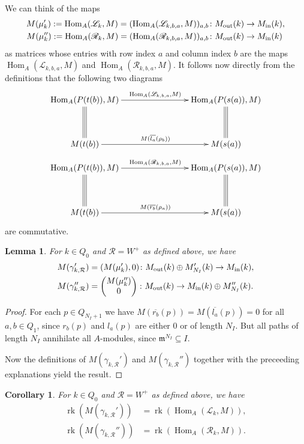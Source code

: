 \documentclass[12pt,reqno]{amsart}
\newtheorem{Lem}[Thm]{Lemma}
\newtheorem{Cor}[Thm]{Corollary}
\theoremstyle{definition}
\newcommand{\df}{\colon}
\newcommand{\scL}{{\mathscr L}}
\newcommand{\scR}{{\mathscr R}}
\newcommand{\cR}{{\mathcal R}}
\newcommand{\m}{\mathfrak{m}}
\newcommand{\rk}{\operatorname{rk}}
\newcommand{\Hom}{\operatorname{Hom}}
\newcommand{\ov}{\overline}
\begin{document}
We can think of the maps 
\begin{align*}
M(\mu_k') := \Hom_A(\scL_k,M) = (\Hom_A(\scL_{k,b,a},M))_{a,b}
\df M_{\rm out}(k) &\to M_{\rm in}(k),
\\
M(\mu_k'') := \Hom_A(\scR_k,M)= (\Hom_A(\scR_{k,b,a},M))_{a,b}\df 
M_{\rm out}(k) &\to M_{\rm in}(k)
\end{align*}
as matrices whose entries with row index $a$ and column index 
$b$ are the maps $\Hom_A(\scL_{k,b,a},M)$ and 
$\Hom_A(\scR_{k,b,a},M)$.
It follows now directly from the definitions that
the following two
diagrams
$$
\xymatrix@+3ex{
\Hom_A(P(t(b)),M) \ar@3{-}[d] \ar[rr]^{\Hom_A(\scL_{k,b,a},M)} 
&& \Hom_A(P(s(a)),M) \ar@3{-}[d]
\\
M(t(b)) \ar[rr]^{M(\ov{l_a}(\rho_b))} && M(s(a))
}
$$
$$
\xymatrix@+3ex{
\Hom_A(P(t(b)),M) \ar@3{-}[d] \ar[rr]^{\Hom_A(\scR_{k,b,a},M)} 
&& \Hom_A(P(s(a)),M) \ar@3{-}[d]
\\
M(t(b)) \ar[rr]^{M(\ov{r_b}(\rho_a))} && M(s(a))
}
$$
are commutative.

\begin{Lem}\label{lem:h2}
For $k \in Q_0$ and $\cR = W^+$ as defined above, we have
\begin{align*}
M(\gamma_{k,\cR}') &= (M(\mu_k'),0)\df 
M_{\rm out}(k) \oplus M_{N_I}'(k) \to M_{\rm in}(k),
\\
M(\gamma_{k,\cR}'') &= \left(\begin{matrix} M(\mu_k'')\\0\end{matrix}\right)\df 
M_{\rm out}(k)  \to M_{\rm in}(k) \oplus M_{N_I}''(k).
\end{align*}
\end{Lem}

\begin{proof}
For each $p \in Q_{N_I+1}$ we have
$M(\overline{r_b}(p)) = M(\overline{l_a}(p)) = 0$ for all
$a,b \in Q_1$, since $r_b(p)$ and $l_a(p)$ are either $0$ or of length $N_I$.
But all paths of length $N_I$ annihilate all $A$-modules, since
$\m^{N_I} \subseteq I$.

Now the definitions of $M(\gamma_{k,\cR}')$ and 
$M(\gamma_{k,\cR}'')$ together with the preceeding explanations yield the result.
\end{proof}

\begin{Cor}\label{cor:h2}
For $k \in Q_0$ and $\cR = W^+$ as defined above, we have
\begin{align*}
\rk(M(\gamma_{k,\cR}')) &= \rk(\Hom_A(\scL_k,M)),
\\
\rk(M(\gamma_{k,\cR}'')) &= \rk(\Hom_A(\scR_k,M)).
\end{align*}
\end{Cor}
\end{document}
